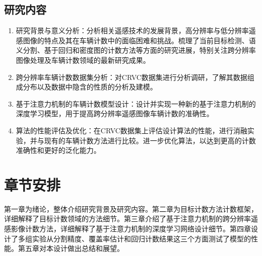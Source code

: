 \subsection{研究内容}
\begin{enumerate}
    \item 研究背景与意义分析：分析相关遥感技术的发展背景，高分辨率与低分辨率遥感图像的特点及其在车辆计数中的面临困难和挑战。梳理了当前目标检测、语义分割、基于回归和密度图的计数方法等方面的研究进展，特别关注跨分辨率图像处理及车辆计数领域的最新研究成果。
    \item 跨分辨率车辆计数数据集分析：对CRVC数据集进行分析调研，了解其数据组成分布以及数据中隐含的性质的分析及建模。
    \item 基于注意力机制的车辆计数模型设计：设计并实现一种新的基于注意力机制的深度学习模型，用于提高跨分辨率遥感图像车辆计数的准确性。
    \item 算法的性能评估及优化：在CRVC数据集上评估设计算法的性能，进行消融实验，并与现有的车辆计数方法进行比较。进一步优化算法，以达到更高的计数准确性和更好的泛化能力。
\end{enumerate}

\section{章节安排}
第一章为绪论，整体介绍研究背景及研究内容。第二章为目标计数方法计数框架，详细解释了目标计数领域的方法细节。第三章介绍了基于注意力机制的跨分辨率遥感影像计数方法，详细解释了基于注意力机制的深度学习网络设计细节。第四章设计了多组实验从分割精度、覆盖率估计和回归计数结果这三个方面测试了模型的性能。第五章对本设计做出总结和展望。

